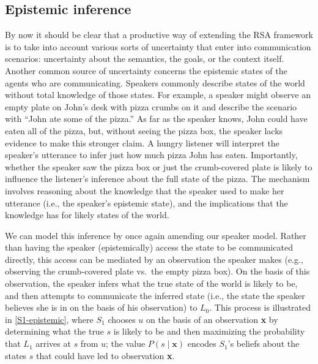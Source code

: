 \documentclass{sp}
\newcommand{\gcs}[1]{\textcolor{blue}{[gcs: #1]}}
\newcommand{\mf}[1]{\textcolor{orange}{[mf: #1]}}
\newcommand{\mht}[1]{\textcolor{purple}{[mht: #1]}}
\begin{document}

\subsection{Epistemic inference}

By now it should be clear that a productive way of extending the RSA framework is to take into account various sorts of uncertainty that enter into communication scenarios: uncertainty about the semantics, the goals, or the context itself. Another common source of uncertainty concerns the epistemic states of the agents who are communicating. Speakers commonly describe states of the world without total knowledge of those states. For example, a speaker might observe an empty plate on John's desk with pizza crumbs on it and describe the scenario with ``John ate some of the pizza.'' As far as the speaker knows, John could have eaten all of the pizza, but, without seeing the pizza box, the speaker lacks evidence to make this stronger claim. A hungry listener will interpret the speaker's utterance to infer just how much pizza John has eaten. Importantly, whether the speaker saw the pizza box or just the crumb-covered plate is likely to influence the listener's inference about the full state of the pizza. The mechanism involves reasoning about the knowledge that the speaker used to make her utterance (i.e., the speaker's epistemic state), and the implications that the knowledge has for likely states of the world.

We can model this inference by once again amending our speaker model. Rather than having the speaker (epistemically) access the state to be communicated directly, this access can be mediated by an observation the speaker makes (e.g., observing the crumb-covered plate vs.~the empty pizza box). On the basis of this observation, the speaker infers what the true state of the world is likely to be, and then attempts to communicate the inferred state (i.e., the state the speaker believes she is in on the basis of his observation) to $L_0$. 
This process is illustrated in \eqref{S1-epistemic}, where $S_1$ chooses $u$ on the basis of an observation \textbf{x} by determining what the true $s$ is likely to be and then maximizing the probability that $L_1$ arrives at $s$ from $u$; the value $P(s\mid \textbf{x})$ encodes $S_1$'s beliefs about the states $s$ that could have led to observation \textbf{x}.
\end{document}
